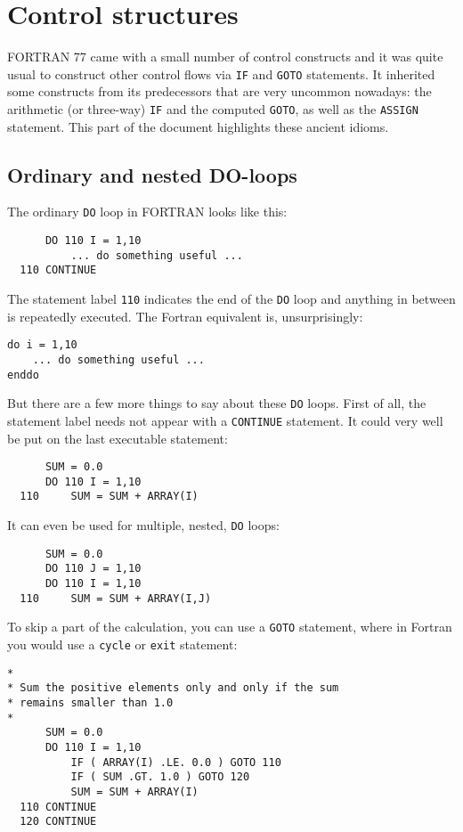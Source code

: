 \section{Control structures}
FORTRAN 77 came with a small number of control constructs and it was quite usual to construct
other control flows via \verb+IF+ and \verb+GOTO+ statements. It inherited some constructs
from its predecessors that are very uncommon nowadays: the arithmetic (or three-way) \verb+IF+ and the
computed \verb+GOTO+, as well as the \verb+ASSIGN+ statement. This part of the document
highlights these ancient idioms.

\subsection{Ordinary and nested DO-loops}
The ordinary \verb+DO+ loop in FORTRAN looks like this:
%
\begin{verbatim}
      DO 110 I = 1,10
          ... do something useful ...
  110 CONTINUE
\end{verbatim}
%
The statement label \verb+110+ indicates the end of the \verb+DO+ loop and anything in between
is repeatedly executed. The Fortran equivalent is, unsurprisingly:
%
\begin{verbatim}
do i = 1,10
    ... do something useful ...
enddo
\end{verbatim}
%
But there are a few more things to say about these \verb+DO+ loops. First of all, the
statement label needs not appear with a \verb+CONTINUE+ statement. It could very well be
put on the last executable statement:
%
\begin{verbatim}
      SUM = 0.0
      DO 110 I = 1,10
  110     SUM = SUM + ARRAY(I)
\end{verbatim}
%
It can even be used for multiple, nested, \verb+DO+ loops:
%
\begin{verbatim}
      SUM = 0.0
      DO 110 J = 1,10
      DO 110 I = 1,10
  110     SUM = SUM + ARRAY(I,J)
\end{verbatim}
%
To skip a part of the calculation, you can use a \verb+GOTO+ statement, where in Fortran
you would use a \verb+cycle+ or \verb+exit+ statement:
%
\begin{verbatim}
*
* Sum the positive elements only and only if the sum
* remains smaller than 1.0
*
      SUM = 0.0
      DO 110 I = 1,10
          IF ( ARRAY(I) .LE. 0.0 ) GOTO 110
          IF ( SUM .GT. 1.0 ) GOTO 120
          SUM = SUM + ARRAY(I)
  110 CONTINUE
  120 CONTINUE
\end{verbatim}
